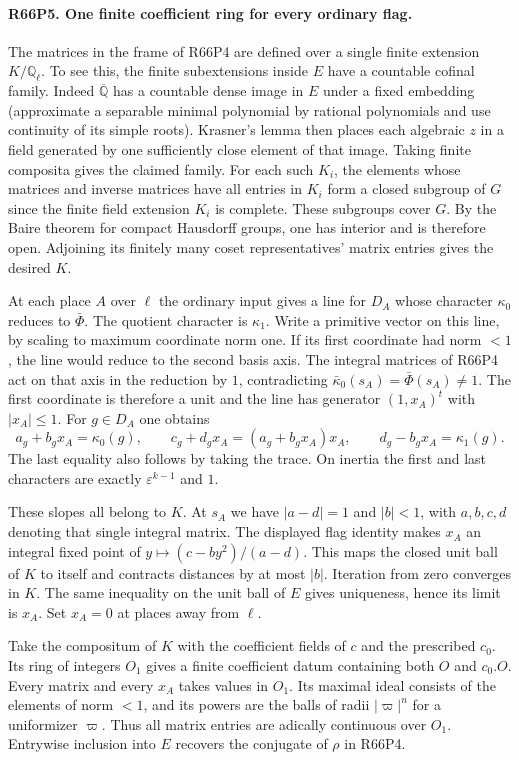 \paragraph{R66P5. One finite coefficient ring for every ordinary flag.}
The matrices in the frame of R66P4 are defined over a single finite
extension $K/\mathbb Q_\ell$. To see this, the finite subextensions
inside $E$ have a countable cofinal family. Indeed
$\overline{\mathbb Q}$ has a countable dense image in $E$ under
a fixed embedding (approximate a separable minimal polynomial by
rational polynomials and use continuity of its simple roots).
Krasner's lemma then places each algebraic $z$ in a field generated
by one sufficiently close element of that image. Taking finite
composita gives the claimed family. For each such $K_i$, the
elements whose matrices and inverse matrices have all entries in
$K_i$ form a closed subgroup of $G$ since the finite field
extension $K_i$ is complete. These subgroups cover $G$. By the
Baire theorem for compact Hausdorff groups, one has interior and is
therefore open. Adjoining its finitely many coset representatives'
matrix entries gives the desired $K$.

At each place $A$ over $\ell$ the ordinary input gives a line
for $D_A$ whose character $\kappa_0$ reduces to $\bar\Phi$.
The quotient character is $\kappa_1$. Write a primitive vector
on this line, by scaling to maximum coordinate norm one. If its
first coordinate had norm $<1$, the line would reduce to the
second basis axis. The integral matrices of R66P4 act on that
axis in the reduction by $1$, contradicting
$\bar\kappa_0(s_A)=\bar\Phi(s_A)\ne1$. The first coordinate
is therefore a unit and the line has generator $(1,x_A)^t$ with
$|x_A|\le1$. For $g\in D_A$ one obtains
\[
 a_g+b_gx_A=\kappa_0(g),\qquad
 c_g+d_gx_A=(a_g+b_gx_A)x_A,\qquad
 d_g-b_gx_A=\kappa_1(g).
\]
The last equality also follows by taking the trace. On inertia
the first and last characters are exactly $\varepsilon^{k-1}$
and $1$.

These slopes all belong to $K$. At $s_A$ we have $|a-d|=1$ and
$|b|<1$, with $a,b,c,d$ denoting that single integral matrix.
The displayed flag identity makes $x_A$ an integral fixed point of
$y\mapsto(c-by^2)/(a-d)$. This maps the closed unit ball of $K$
to itself and contracts distances by at most $|b|$. Iteration
from zero converges in $K$. The same inequality on the unit ball
of $E$ gives uniqueness, hence its limit is $x_A$. Set $x_A=0$
at places away from $\ell$.

Take the compositum of $K$ with the coefficient fields of $c$ and
the prescribed $c_0$. Its ring of integers $O_1$ gives a finite
coefficient datum containing both $O$ and $c_0.O$. Every matrix
and every $x_A$ takes values in $O_1$. Its maximal ideal consists
of the elements of norm $<1$, and its powers are the balls of radii
$|\varpi|^n$ for a uniformizer $\varpi$. Thus all matrix entries
are adically continuous over $O_1$. Entrywise inclusion into $E$
recovers the conjugate of $\rho$ in R66P4.

